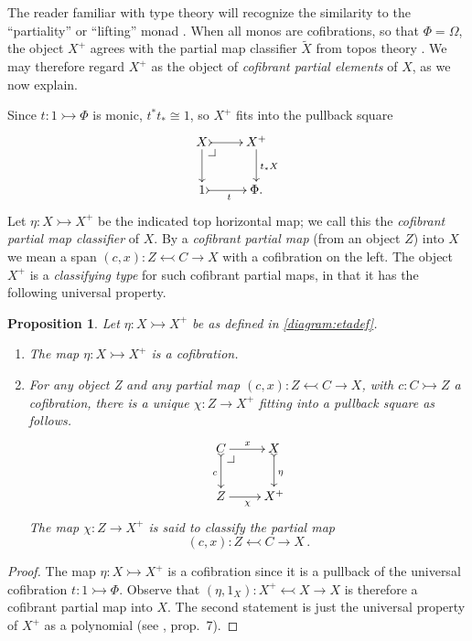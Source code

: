 \documentclass[11pt]{amsart}
\makeatletter
\newcommand{\mono}{\ensuremath{\rightarrowtail}}
\newcommand{\ra}{\ensuremath{\rightarrow}}
\newcommand{\cof}{\ensuremath{\rightarrowtail}}
\newtheorem{proposition}[theorem]{Proposition}
\theoremstyle{remark}
\theoremstyle{definition}
\newcommand{\pbcorner}[1][dr]{\save*!/#1-1.2pc/#1:(-1,1)@^{|-}\restore}
\makeatother
\begin{document}
The reader familiar with type theory will recognize the similarity to the ``partiality'' or ``lifting''  monad \cite{something}.  When all monos are cofibrations, so that $\Phi = \Omega$, the object $X^+$ agrees with the partial map classifier $\widetilde{X}$ from topos theory \cite{JohnstoneTT}.  We may therefore regard $X^+$ as the object of \emph{cofibrant partial elements} of $X$, as we now explain.

Since $t: 1\cof \Phi$ is monic, $t^*t_*\cong 1$, so $X^+$ fits into the  pullback square
\begin{equation}\label{diagram:etadef}
\xymatrix{
X \ar[d]\pbcorner \ar@{>->}[r] & X^+ \ar[d]^{t_*X}\\
1 \ar@{>->}[r]_{t} & \Phi.
}
\end{equation}
Let $\eta : X\mono X^+$ be the indicated top horizontal map; we call this the \emph{cofibrant partial map classifier} of $X$.  By a \emph{cofibrant partial map} (from an object $Z$) into $X$ we mean a span $(c,x): Z\leftarrowtail C\ra X$ with a cofibration on the left.  The object $X^+$ is a \emph{classifying type} for such cofibrant partial maps, in that it has the following universal property.
 
\begin{proposition}\label{prop:cofparclass}
Let $\eta : X\mono X^+$ be as defined in \eqref{diagram:etadef}. 
\begin{enumerate}
\item The map $\eta : X\mono X^+$ is a cofibration.
\item For any object Z and any partial map $(c,x): Z\leftarrowtail C\ra X$, with $c : C\mono Z$ a cofibration, there is a unique $\chi : Z\ra X^+$ fitting into a pullback square as follows.
\[
\xymatrix{
C \ar@{>->}[d]_{c} \pbcorner \ar[r]^x & X \ar@{>->}[d]^{\eta}\\
Z \ar[r]_\chi & X^+
}
\]
The map $\chi : Z\ra X^+$ is said to \emph{classify} the partial map $$(c,x): Z\leftarrowtail C\ra X\,.$$
\end{enumerate}
\end{proposition}

\begin{proof}
The map $\eta : X\mono X^+$ is a cofibration since it is a pullback of the universal cofibration $t : 1\cof \Phi$. Observe that $(\eta, 1_X) : X^+\leftarrowtail X\ra X$ is therefore a cofibrant partial map into $X$.  The second statement is just the universal property of $X^+$ as a polynomial (see \cite{AN}, prop.~7). 
\end{proof}
\end{document}
